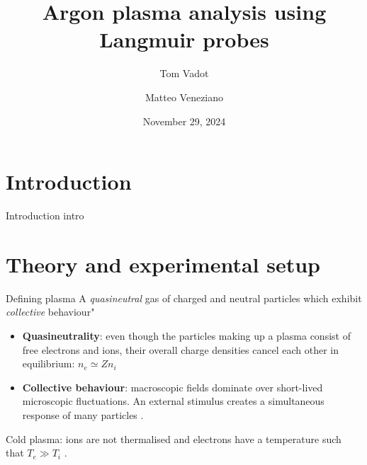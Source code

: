 \documentclass[10pt]{beamer}
\title[(À enlever)]{Argon plasma analysis using Langmuir probes}
\author[Tom Vadot \and Matteo Veneziano]{Tom Vadot \and Matteo Veneziano}
\institute[]{EPFL Section of Physics}
\date{November 29, 2024}
\begin{document}
\begin{frame}
    \titlepage
\end{frame}

\section{Introduction}
\begin{frame}{Introduction}
    intro
\end{frame}

\section{Theory and experimental setup}
\begin{frame}{Defining plasma}
    A \emph{quasineutral} gas of charged and neutral particles which exhibit \emph{collective} behaviour" 
    \vspace{0.5cm}
    \begin{itemize}
        \item \textbf{Quasineutrality}: even though the particles making up a plasma consist of free electrons and ions, their overall charge densities cancel each other in equilibrium: 
            $n_e \simeq Z n_i$ 

        \item \textbf{Collective behaviour}: macroscopic fields dominate over short-lived microscopic fluctuations.
            An external stimulus creates a simultaneous response of many particles .
    \end{itemize}
    \vspace{0.5cm}
    Cold plasma: ions are not thermalised and electrons have a temperature such that $T_e \gg T_i$ .
\end{frame}
\end{document}
